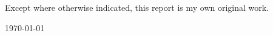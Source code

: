 \vspace*{7cm}
\begin{center}
  Except where otherwise indicated, this report is my own original
  work.
\end{center}

\vspace*{4cm}

\hspace{8cm}\makeatletter\@author\makeatother\par
\hspace{8cm}\today
